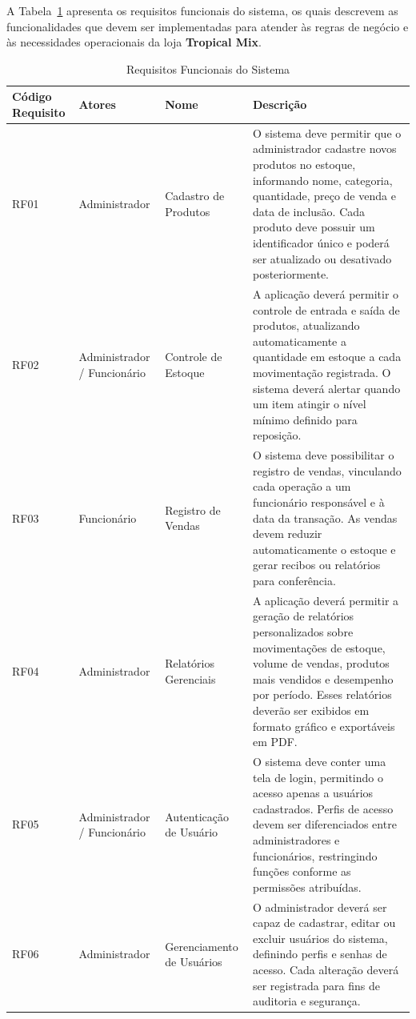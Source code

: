 A Tabela~\ref{tab:requisitos-funcionais} apresenta os requisitos funcionais do sistema, os quais descrevem as funcionalidades que devem ser implementadas para atender às regras de negócio e às necessidades operacionais da loja \textbf{Tropical Mix}.

\begin{table}[H]
\centering
\caption{Requisitos Funcionais do Sistema}
\label{tab:requisitos-funcionais}
\begin{tabular}{|p{2cm}|p{3cm}|p{3.5cm}|p{7cm}|}
\hline
\textbf{Código Requisito} & \textbf{Atores} & \textbf{Nome} & \textbf{Descrição} \\ \hline
RF01 & Administrador & Cadastro de Produtos & O sistema deve permitir que o administrador cadastre novos produtos no estoque, informando nome, categoria, quantidade, preço de venda e data de inclusão. Cada produto deve possuir um identificador único e poderá ser atualizado ou desativado posteriormente. \\ \hline
RF02 & Administrador / Funcionário & Controle de Estoque & A aplicação deverá permitir o controle de entrada e saída de produtos, atualizando automaticamente a quantidade em estoque a cada movimentação registrada. O sistema deverá alertar quando um item atingir o nível mínimo definido para reposição. \\ \hline
RF03 & Funcionário & Registro de Vendas & O sistema deve possibilitar o registro de vendas, vinculando cada operação a um funcionário responsável e à data da transação. As vendas devem reduzir automaticamente o estoque e gerar recibos ou relatórios para conferência. \\ \hline
RF04 & Administrador & Relatórios Gerenciais & A aplicação deverá permitir a geração de relatórios personalizados sobre movimentações de estoque, volume de vendas, produtos mais vendidos e desempenho por período. Esses relatórios deverão ser exibidos em formato gráfico e exportáveis em PDF. \\ \hline
RF05 & Administrador / Funcionário & Autenticação de Usuário & O sistema deve conter uma tela de login, permitindo o acesso apenas a usuários cadastrados. Perfis de acesso devem ser diferenciados entre administradores e funcionários, restringindo funções conforme as permissões atribuídas. \\ \hline
RF06 & Administrador & Gerenciamento de Usuários & O administrador deverá ser capaz de cadastrar, editar ou excluir usuários do sistema, definindo perfis e senhas de acesso. Cada alteração deverá ser registrada para fins de auditoria e segurança. \\ \hline

\end{tabular}
\end{table}

